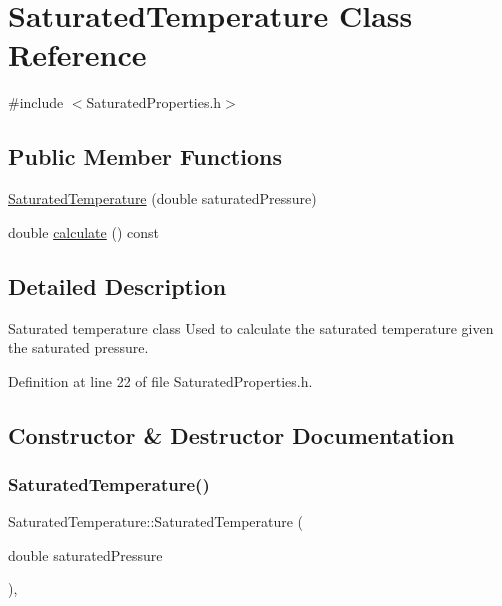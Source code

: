 \hypertarget{class_saturated_temperature}{}\section{Saturated\+Temperature Class Reference}
\label{class_saturated_temperature}


{\ttfamily \#include $<$Saturated\+Properties.\+h$>$}

\subsection*{Public Member Functions}
\begin{DoxyCompactItemize}
\item 
\hyperlink{class_saturated_temperature_ae0a4b1684a756ac8f91d3ebb646d6865}{Saturated\+Temperature} (double saturated\+Pressure)
\item 
double \hyperlink{class_saturated_temperature_a4aa0d2a337289dd36f4e063f1f67aaa5}{calculate} () const
\end{DoxyCompactItemize}


\subsection{Detailed Description}
Saturated temperature class Used to calculate the saturated temperature given the saturated pressure. 

Definition at line 22 of file Saturated\+Properties.\+h.



\subsection{Constructor \& Destructor Documentation}
\mbox{\label{class_saturated_temperature_ae0a4b1684a756ac8f91d3ebb646d6865}} 
\subsubsection{\texorpdfstring{Saturated\+Temperature()}{SaturatedTemperature()}}
{\footnotesize\ttfamily Saturated\+Temperature\+::\+Saturated\+Temperature (\begin{DoxyParamCaption}\item[{double}]{saturated\+Pressure }\end{DoxyParamCaption})\hspace{0.3cm}{\ttfamily [inline]}, {\ttfamily [explicit]}}

